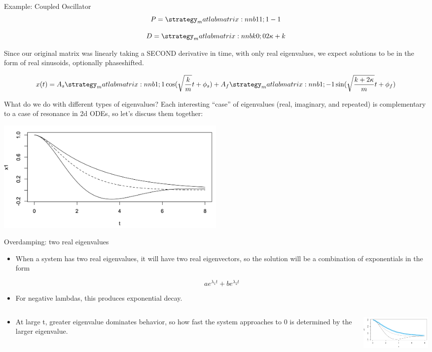 \documentclass{beamer}
\begin{document}
	\begin{frame}{Example: Coupled Oscillator}
	    $$P = \mat{1 1; 1 -1}$$
        
        $$D = \mat{k 0; 0 2\kappa+k}$$
        
        Since our original matrix was linearly taking a SECOND derivative in time, with only real eigenvalues, we expect solutions to be in the form of real sinusoids, optionally phaseshifted.

        $$x(t) = A_s\mat{1;1}\cos(\sqrt{\frac{k}{m}}t + \phi_s) + A_f\mat{1;-1}\sin(\sqrt{\frac{k + 2\kappa}{m}}t + \phi_f)$$
	\end{frame}
	
	\begin{frame}{What do we do with different types of eigenvalues?}
	    Each interesting “case” of eigenvalues (real, imaginary, and repeated) is complementary to a case of resonance in 2d ODEs, so let’s discuss them together:
        
        \begin{center}
            \includegraphics[width=0.5\textwidth]{eigenvalue-types-1.png}
        \end{center}
	\end{frame}
	
	\begin{frame}{Overdamping: two real eigenvalues}
	    \begin{itemize}
	        \item When a system has two real eigenvalues, it will have two real eigenvectors, so the solution will be a combination of exponentials in the form 
            
            $$ae^{\lambda_1t} + be^{\lambda_2t}$$
            
            \item For negative lambdas, this produces exponential decay.
            
            \item
            \begin{columns}[onlytextwidth,T]
            \column{\dimexpr\linewidth-40mm-5mm}
        	    At large t, greater eigenvalue dominates behavior, so how fast the system approaches to 0 is determined by the larger eigenvalue.
        	
        	\column{40mm}
        	    \includegraphics[width=40mm]{eigenvalue-types-3.png}
    	    \end{columns}
	    \end{itemize}
	\end{frame}
	
\end{document}
